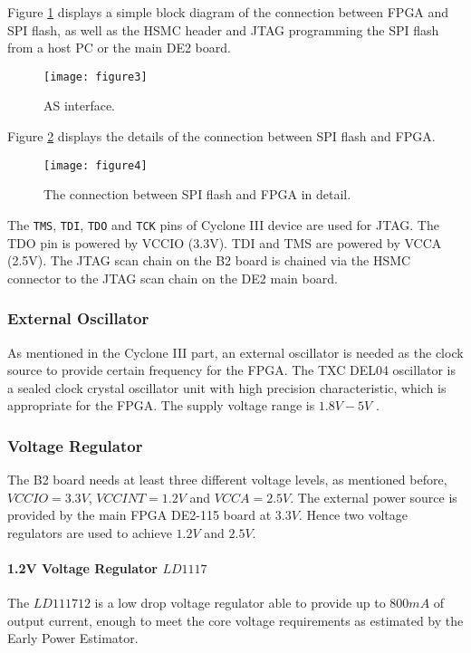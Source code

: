Figure \ref{fig:b2_f3} displays a simple block diagram of the connection between FPGA and SPI flash,
as well as the HSMC header and JTAG programming the SPI flash from a host PC or the main DE2 board.

\begin{figure}
 \centering
 \texttt{[image: figure3]}
 \caption{AS interface.}
 \label{fig:b2_f3}
\end{figure}


Figure \ref{fig:b2_f4} displays the details of the connection between SPI flash and FPGA.

\begin{figure}
 \centering
 \texttt{[image: figure4]}
 \caption{The connection between SPI flash and FPGA in detail.}
 \label{fig:b2_f4}
\end{figure}

The \texttt{TMS}, \texttt{TDI}, \texttt{TDO} and \texttt{TCK} pins of Cyclone III device are
used for JTAG. The TDO pin is powered by VCCIO (3.3V). TDI and TMS are powered by VCCA (2.5V). The JTAG
scan chain on the B2 board is chained via the HSMC connector to the JTAG scan chain on the DE2 main board.


\subsubsection{External Oscillator}

As mentioned in the Cyclone III part, an external oscillator is needed as the clock source to provide certain frequency for the FPGA.
The TXC DEL04 oscillator is a sealed clock crystal oscillator unit with high precision characteristic, which is appropriate for the FPGA.
The supply voltage range is $1.8V-5V$ \citep{TXC:osc_datasheet}.


\subsubsection{Voltage Regulator}
The B2 board needs at least three different voltage levels, as mentioned before, $VCCIO=3.3V$, $VCCINT= 1.2V$ and $VCCA=2.5V$.
The external power source is provided by the main FPGA DE2-115 board at $3.3V$. Hence two voltage regulators are used to achieve $1.2V$ and $2.5V$.

\paragraph{1.2V Voltage Regulator \texorpdfstring{$LD1117$}{LD1117}}
The $LD111712$ is a low drop voltage regulator able to provide up to $800mA$ of output current, enough to meet the
core voltage requirements as estimated by the Early Power Estimator.

